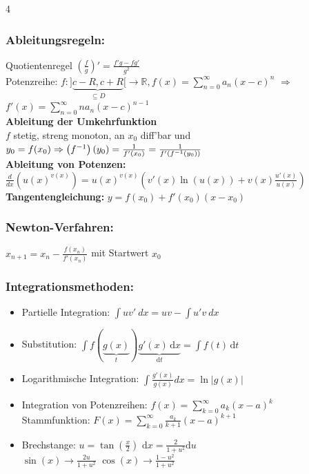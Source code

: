 \documentclass[6pt,a4paper]{scrartcl}
\newcommand{\abs}[1]{\ensuremath{\left\vert#1\right\vert}}
\newcommand{\enbrace}[1]{\ensuremath{\left(#1\right)}}
\begin{document}
\begin{multicols*}{4}
    \subsubsection{Ableitungsregeln:}
    Quotientenregel $\enbrace{\frac{f}{g}}' = \frac{f'g - fg'}{g^2}$\\
    Potenzreihe: $f: ] \underbrace{c-R, c+R}_{\subseteq D}	 [ \rightarrow \mathbb R, f(x) = \sum_{n=0}^{\infty} a_n (x -c)^n$ \quad $\Rightarrow$ \quad $f'(x) = \sum_{n=0}^{\infty} n a_{n} (x-c)^{n-1}$\\
    \textbf{Ableitung der Umkehrfunktion} \\
    $f$ stetig, streng monoton, an $x_0$ diff'bar und $y_0=f(x_0) \\
        \Rightarrow \enbrace{f^{-1}}(y_0)= \frac{1}{f'(x_0)} =\frac{1}{f'(f^{-1}\enbrace{y_0})}$\\
    \textbf{Ableitung von Potenzen:}\\
    $\frac{d}{dx}(u(x)^{v(x)})=u(x)^{v(x)}(v'(x)\ln(u(x))+v(x)\frac{u'(x)}{u(x)})$\\
    \textbf{Tangentengleichung:} $y=f(x_0)+f'(x_0)(x-x_0)$

    \subsubsection{Newton-Verfahren:}
    $x_{n+1}=x_n-\frac{f(x_n)}{f'(x_n)}$ mit Startwert $x_0$

    \subsubsection{Integrationsmethoden:}
    \begin{itemize}\itemsep0pt
        \item Partielle Integration: $\int uv'\ dx=uv-\int u'v\ dx$
        \item Substitution: $\int f(\underbrace {g(x)}_{t}) \underbrace {g'(x)\,\mathrm dx}_{\mathrm dt}=\int f(t)\, \mathrm dt$
        \item Logarithmische Integration: $\int \frac{g'(x)}{g(x)}dx=\ln\abs{g(x)}$
        \item Integration von Potenzreihen: $f(x)=\sum_{k=0}^{\infty}a_k(x-a)^k$ \\
              Stammfunktion: $F(x)=\sum_{k=0}^{\infty}\frac{a_k}{k+1}(x-a)^{k+1}$
        \item Brechstange: $u=\tan(\frac{x}{2})$ \quad $\mathrm dx = \frac{2}{1+u^2} \mathrm du$ \\ $\sin(x) \rightarrow \frac{2u}{1+u^2}$ \qquad $\cos(x) \rightarrow \frac{1-u^2}{1+u^2}$
    \end{itemize}


\end{multicols*}
\end{document}
